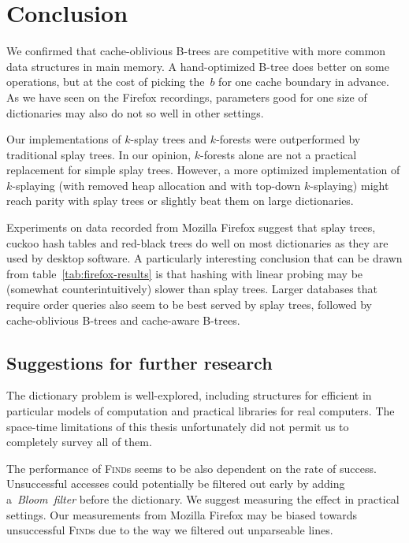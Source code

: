 \chapter*{Conclusion}

We confirmed that cache-oblivious B-trees are competitive with more common
data structures in main memory. A hand-optimized B-tree does better on some
operations, but at the cost of picking the~$b$ for one cache boundary
in advance. As we have seen on the Firefox recordings, parameters good for one
size of dictionaries may also do not so well in other settings.

Our implementations of $k$-splay trees and $k$-forests were outperformed
by traditional splay trees. In our opinion, $k$-forests alone are not
a practical replacement for simple splay trees. However, a more optimized
implementation of $k$-splaying (with removed heap allocation and with top-down
$k$-splaying) might reach parity with splay trees or slightly beat them
on large dictionaries.

Experiments on data recorded from Mozilla Firefox suggest that splay trees,
cuckoo hash tables and red-black trees do well on most dictionaries as they
are used by desktop software. A particularly interesting conclusion that can be
drawn from table~\ref{tab:firefox-results} is that hashing with linear probing
may be (somewhat counterintuitively) slower than splay trees.
Larger databases that require order queries also seem to be best served
by splay trees, followed by cache-oblivious \mbox{B-trees} and cache-aware
\mbox{B-trees}.

\section*{Suggestions for further research}
The dictionary problem is well-explored, including structures for efficient
in particular models of computation and practical libraries for real computers.
The space-time limitations of this thesis unfortunately did not permit us to
completely survey all of them.

The performance of \textsc{Find}s seems to be also dependent on
the rate of success. Unsuccessful accesses could potentially be filtered out
early by adding a~\emph{Bloom~filter} before the dictionary. We suggest
measuring the effect in practical settings. Our measurements from Mozilla
Firefox may be biased towards unsuccessful \textsc{Find}s due to the way we
filtered out unparseable lines.

